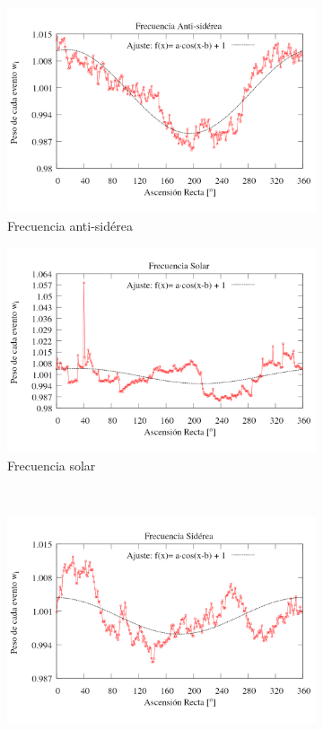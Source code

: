 \begin{figure}[H]
\begin{subfigure}{.5\textwidth}
	\centering
	\includegraphics[width=\linewidth]{eventos_RA_ajuste_cos_antisiderea_v2.png}
	\caption{Frecuencia anti-sidérea}
	\label{fig:ajuste_antisiderea}
\end{subfigure}%
\begin{subfigure}{.5\textwidth}
	\centering
	\includegraphics[width=\linewidth]{eventos_RA_ajuste_cos_solar_v3.png}
	\caption{Frecuencia solar}
	\label{fig:ajuste_solar}
\end{subfigure}\\
\centering
\begin{subfigure}{.5\textwidth}
	\centering
	\includegraphics[width=\linewidth]{eventos_RA_ajuste_cos_siderea_v2.png}

\end{subfigure}
\end{figure}

